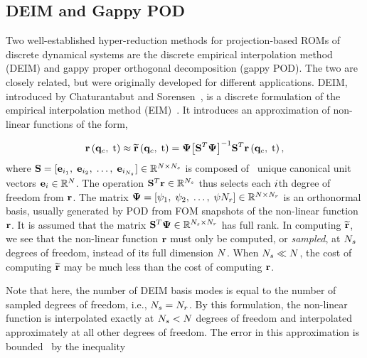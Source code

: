 \subsection{DEIM and Gappy POD}

Two well-established hyper-reduction methods for projection-based ROMs of discrete dynamical systems are the discrete empirical interpolation method (DEIM) and gappy proper orthogonal decomposition (gappy POD). The two are closely related, but were originally developed for different applications. DEIM, introduced by Chaturantabut and Sorensen~\cite{Chaturantabut2010}, is a discrete formulation of the empirical interpolation method (EIM)~\cite{Barrault2004}. It introduces an approximation of non-linear functions of the form,

\begin{equation}\label{eq:deimRHSApprox}
    \resFunc{\consVec, \; \timeVar} \approx \resApproxFunc{\consVec, \; \timeVar} = \deimBasis \big[ \sampMat^T \deimBasis \big]^{-1} \sampMat^T \resFunc{\consVec, \; \timeVar},
\end{equation}
where $\mathbf{S} = [\mathbf{e}_{i_1}, \; \mathbf{e}_{i_2}, \; \hdots, \; \mathbf{e}_{i_{N_s}} ] \in \mathbb{R}^{N \times N_s}$ is composed of \numSamps\ unique canonical unit vectors $\mathbf{e}_{i} \in \mathbb{R}^{N}$. The operation $\mathbf{S}^T \mathbf{r} \in \mathbb{R}^{N_s}$ thus selects each $i$th degree of freedom from $\mathbf{r}$. The matrix $\deimBasis = [\deimBasisVec_1, \; \deimBasisVec_2, \; \hdots, \; \deimBasisVec{\numResModes}] \inRTwo{\numDOF}{\numResModes}$ is an orthonormal basis, usually generated by POD from FOM snapshots of the non-linear function $\mathbf{r}$. It is assumed that the matrix $\sampMat^T \deimBasis \inRTwo{\numSamps}{\numResModes}$ has full rank. In computing $\mathbf{\widetilde{r}}$, we see that the non-linear function $\mathbf{r}$ must only be computed, or \textit{sampled}, at $N_s$ degrees of freedom, instead of its full dimension $N$. When $N_s \ll N$, the cost of computing $\mathbf{\widetilde{r}}$ may be much less than the cost of computing $\mathbf{r}$.

Note that here, the number of DEIM basis modes is equal to the number of sampled degrees of freedom, i.e., $N_s = N_r$. By this formulation, the non-linear function is interpolated exactly at $N_s < N$ degrees of freedom and interpolated approximately at all other degrees of freedom. The error in this approximation is bounded~\cite{Chaturantabut2010} by the inequality

